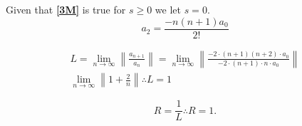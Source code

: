 \documentclass{article}
\begin{document}
Given that \textbf{\ref{3M}} is true for $s\geq0$ we let $s = 0$.
\begin{equation*}
a_2=\frac{-n(n+1)a_0}{2!}
\end{equation*}

\begin{align*}
L = \lim_{n\to\infty} \left\| \frac{a_{n+1}}{a_n} \right\| = \lim_{n\to\infty}\left\|\frac{-2\cdot (n+1)(n+2)\cdot a_0}{-2\cdot(n+1)\cdot n\cdot a_0}\right\|\\
\lim_{n\to\infty} \left\|1 + \frac{2}{n}\right\| \therefore L=1
\end{align*}

\begin{equation*}
R = \frac{1}{L} \therefore R=1.
\end{equation*}
\end{document}
